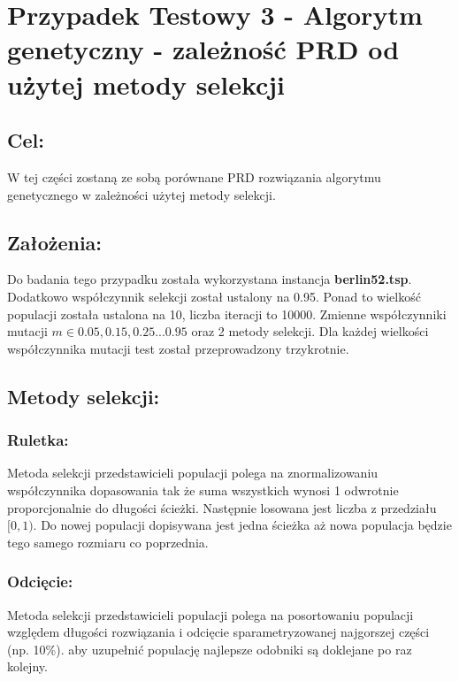 \section{Przypadek Testowy 3 - Algorytm genetyczny - zależność PRD od użytej metody selekcji}
  \subsection{Cel:}
    W tej części zostaną ze sobą porównane PRD rozwiązania algorytmu genetycznego w zależności użytej metody selekcji.
    \subsection{Założenia:}
    Do badania tego przypadku została wykorzystana instancja \textbf{berlin52.tsp}. Dodatkowo współczynnik selekcji został ustalony na 0.95. Ponad to wielkość populacji została ustalona na 10, liczba iteracji to 10000. Zmienne współczynniki mutacji \(m \in {0.05, 0.15, 0.25 ... 0.95}\) oraz 2 metody selekcji. Dla każdej wielkości współczynnika mutacji test został przeprowadzony trzykrotnie.
    \subsection{Metody selekcji:}
    \subsubsection{Ruletka:}
    Metoda selekcji przedstawicieli populacji polega na znormalizowaniu współczynnika dopasowania tak że suma wszystkich wynosi 1 odwrotnie proporcjonalnie do długości ścieżki. Następnie losowana jest liczba z przedziału \( [0, 1)\). Do nowej populacji dopisywana jest jedna ścieżka aż nowa populacja będzie tego samego rozmiaru co poprzednia.
    \subsubsection{Odcięcie:}
    Metoda selekcji przedstawicieli populacji polega na posortowaniu populacji względem długości rozwiązania i odcięcie sparametryzowanej najgorszej części (np. 10\%). aby uzupełnić populację najlepsze odobniki są doklejane po raz kolejny.
